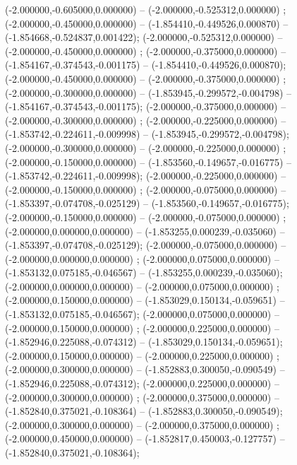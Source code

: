  (-2.000000,-0.605000,0.000000) -- (-2.000000,-0.525312,0.000000) ;
 (-2.000000,-0.450000,0.000000) -- (-1.854410,-0.449526,0.000870) -- (-1.854668,-0.524837,0.001422);
 (-2.000000,-0.525312,0.000000) -- (-2.000000,-0.450000,0.000000) ;
 (-2.000000,-0.375000,0.000000) -- (-1.854167,-0.374543,-0.001175) -- (-1.854410,-0.449526,0.000870);
 (-2.000000,-0.450000,0.000000) -- (-2.000000,-0.375000,0.000000) ;
 (-2.000000,-0.300000,0.000000) -- (-1.853945,-0.299572,-0.004798) -- (-1.854167,-0.374543,-0.001175);
 (-2.000000,-0.375000,0.000000) -- (-2.000000,-0.300000,0.000000) ;
 (-2.000000,-0.225000,0.000000) -- (-1.853742,-0.224611,-0.009998) -- (-1.853945,-0.299572,-0.004798);
 (-2.000000,-0.300000,0.000000) -- (-2.000000,-0.225000,0.000000) ;
 (-2.000000,-0.150000,0.000000) -- (-1.853560,-0.149657,-0.016775) -- (-1.853742,-0.224611,-0.009998);
 (-2.000000,-0.225000,0.000000) -- (-2.000000,-0.150000,0.000000) ;
 (-2.000000,-0.075000,0.000000) -- (-1.853397,-0.074708,-0.025129) -- (-1.853560,-0.149657,-0.016775);
 (-2.000000,-0.150000,0.000000) -- (-2.000000,-0.075000,0.000000) ;
 (-2.000000,0.000000,0.000000) -- (-1.853255,0.000239,-0.035060) -- (-1.853397,-0.074708,-0.025129);
 (-2.000000,-0.075000,0.000000) -- (-2.000000,0.000000,0.000000) ;
 (-2.000000,0.075000,0.000000) -- (-1.853132,0.075185,-0.046567) -- (-1.853255,0.000239,-0.035060);
 (-2.000000,0.000000,0.000000) -- (-2.000000,0.075000,0.000000) ;
 (-2.000000,0.150000,0.000000) -- (-1.853029,0.150134,-0.059651) -- (-1.853132,0.075185,-0.046567);
 (-2.000000,0.075000,0.000000) -- (-2.000000,0.150000,0.000000) ;
 (-2.000000,0.225000,0.000000) -- (-1.852946,0.225088,-0.074312) -- (-1.853029,0.150134,-0.059651);
 (-2.000000,0.150000,0.000000) -- (-2.000000,0.225000,0.000000) ;
 (-2.000000,0.300000,0.000000) -- (-1.852883,0.300050,-0.090549) -- (-1.852946,0.225088,-0.074312);
 (-2.000000,0.225000,0.000000) -- (-2.000000,0.300000,0.000000) ;
 (-2.000000,0.375000,0.000000) -- (-1.852840,0.375021,-0.108364) -- (-1.852883,0.300050,-0.090549);
 (-2.000000,0.300000,0.000000) -- (-2.000000,0.375000,0.000000) ;
 (-2.000000,0.450000,0.000000) -- (-1.852817,0.450003,-0.127757) -- (-1.852840,0.375021,-0.108364);
